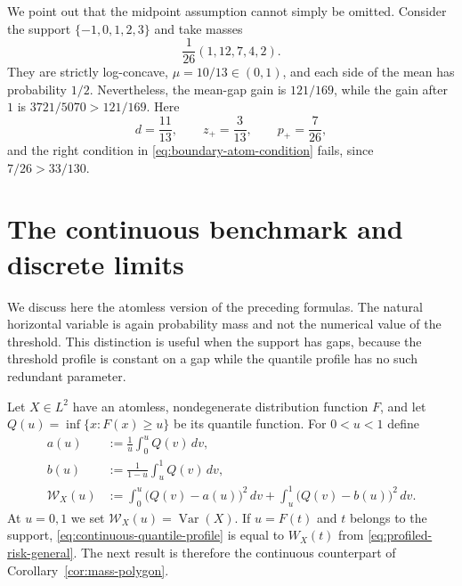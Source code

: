 \documentclass[a4paper]{amsart}
\numberwithin{equation}{section}
\theoremstyle{remark}
\newcommand{\1}{\mathbf 1}
\newcommand{\Var}{\operatorname{Var}}
\begin{document}
We point out that the midpoint assumption cannot simply be omitted.  Consider
the support $\{-1,0,1,2,3\}$ and take masses
\[
  \frac1{26}(1,12,7,4,2).
\]
They are strictly log-concave, $\mu=10/13\in(0,1)$, and each side of the mean
has probability $1/2$.  Nevertheless, the mean-gap gain is $121/169$, while
the gain after $1$ is $3721/5070>121/169$.  Here
\[
 d=\frac{11}{13},\qquad z_+=\frac3{13},\qquad p_+=\frac7{26},
\]
and the right condition in \eqref{eq:boundary-atom-condition} fails, since
$7/26>33/130$.

\section{The continuous benchmark and discrete limits}
\label{sec:continuous-benchmark}

We discuss here the atomless version of the preceding formulas.  The natural
horizontal variable is again probability mass and not the numerical value of
the threshold.  This distinction is useful when the support has gaps, because
the threshold profile is constant on a gap while the quantile profile has no
such redundant parameter.

Let $X\in L^2$ have an atomless, nondegenerate distribution function $F$, and
let $Q(u)=\inf\{x:F(x)\geq u\}$ be its quantile function.  For $0<u<1$ define
\begin{align}
 a(u)&:=\frac1u\int_0^u Q(v)\,dv,\\
 b(u)&:=\frac1{1-u}\int_u^1Q(v)\,dv,
 \label{eq:continuous-centres}\\
 \mathcal W_X(u)&:=
 \int_0^u\bigl(Q(v)-a(u)\bigr)^2\,dv
 +\int_u^1\bigl(Q(v)-b(u)\bigr)^2\,dv.
 \label{eq:continuous-quantile-profile}
\end{align}
At $u=0,1$ we set $\mathcal W_X(u)=\Var(X)$.  If $u=F(t)$ and $t$ belongs to
the support, \eqref{eq:continuous-quantile-profile} is equal to $W_X(t)$ from
\eqref{eq:profiled-risk-general}.  The next result is therefore the continuous
counterpart of Corollary~\ref{cor:mass-polygon}.
\end{document}
